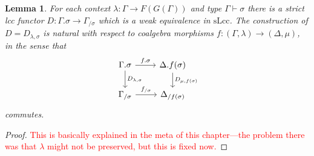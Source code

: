 \documentclass{article}
\newcommand{\todo}[1]{\textcolor{red}{#1}}
\newtheorem{lemma}{Lemma}
\theoremstyle{remark}
\theoremstyle{definition}
\begin{document}
\begin{lemma}
  \label{lem:extension-to-slice}
  For each context $\lambda : \Gamma \rightarrow F(G(\Gamma))$ and type $\Gamma \vdash \sigma$ there is a strict lcc functor $D : \Gamma.\sigma \rightarrow \Gamma_{/ \sigma}$ which is a weak equivalence in $\mathrm{sLcc}$.
  The construction of $D = D_{\lambda, \sigma}$ is natural with respect to coalgebra morphisms $f : (\Gamma, \lambda) \rightarrow (\Delta, \mu)$, in the sense that
  \begin{equation}
    \begin{tikzcd}
      \Gamma.\sigma \arrow[d, "D_{\lambda, \sigma}"] \arrow[r, "f.\sigma"] & \Delta.f(\sigma) \arrow[d, "D_{\mu, f(\sigma)}"] \\
      \Gamma_{/ \sigma} \arrow[r, "f_{/ \sigma}"] & \Delta_{/ f(\sigma)}
    \end{tikzcd}
  \end{equation}
  commutes.
\end{lemma}
\begin{proof}
  \todo{This is basically explained in the meta of this chapter---the problem there was that $\lambda$ might not be preserved, but this is fixed now.}
\end{proof}
\end{document}
